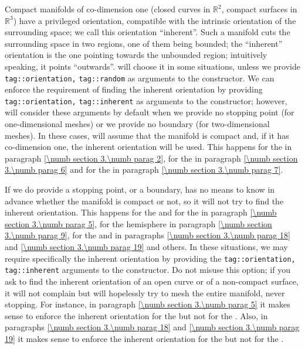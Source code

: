 Compact manifolds of co-dimension one (closed curves in $ \mathbb{R}^2 $,
compact surfaces in $ \mathbb{R}^3 $) have a privileged orientation,
compatible with the intrinsic orientation of the surrounding space;
we call this orientation ``inherent''.
Such a manifold cuts the surrounding space in two regions, one of them being bounded;
the ``inherent'' orientation is the one pointing towards the unbounded region;
intuitively speaking, it points ``outwards''.
{\ManiFEM} will choose it in some situations, unless we provide
{\small\tt\textcolor{tag}{tag}::orientation,} {\small\tt\textcolor{tag}{tag}::random}
as arguments to the {\small\tt{}} constructor.
We can enforce the requirement of finding the inherent orientation by providing
{\small\tt\textcolor{tag}{tag}::orientation,} {\small\tt\textcolor{tag}{tag}::inherent}
as arguments to the {\small\tt{}} constructor;
however, {\maniFEM} will consider these arguments by default when we provide no stopping
point (for one-dimensional meshes) or we provide no boundary (for two-dimensional meshes).
In these cases, {\maniFEM} will assume that the manifold is compact and, if it has
co-dimension one, the inherent orientation will be used.
This happens for the {\small\tt{}} in paragraph \ref{\numb section 3.\numb parag 2},
for the {\small\tt{}} in paragraph \ref{\numb section 3.\numb parag 6} and for the
{\small\tt{}} in paragraph \ref{\numb section 3.\numb parag 7}.

If we do provide a stopping point, or a boundary, {\maniFEM} has no means to know in
advance whether the manifold
is compact or not, so it will not try to find the inherent orientation.
This happens for the {\small\tt{}} and for the {\small\tt{}}
in paragraph \ref{\numb section 3.\numb parag 5}, for the {\small\tt{}} hemisphere
in paragraph \ref{\numb section 3.\numb parag 9}, for the {\small\tt{}} and
{\small\tt{}} in paragraphs \ref{\numb section 3.\numb parag 18} and
\ref{\numb section 3.\numb parag 19} and others.
In these situations, we may require specifically the inherent orientation
by providing the {\small\tt\textcolor{tag}{tag}::orientation,}
{\small\tt\textcolor{tag}{tag}::inherent} arguments to the {\small\tt{}} constructor.
Do not misuse this option; if you ask {\maniFEM} to find the inherent orientation of an open
curve or of a non-compact surface, it will not complain but will hopelessly try to mesh
the entire manifold, never stopping.
For instance, in paragraph \ref{\numb section 3.\numb parag 5} it makes sense to enforce the
inherent orientation for the {\small\tt{}} but not for the
{\small\tt{}}.
Also, in paragraphs \ref{\numb section 3.\numb parag 18} and
\ref{\numb section 3.\numb parag 19} it makes sense to enforce the inherent orientation
for the {\small\tt{}} but not for the {\small\tt{}}.

